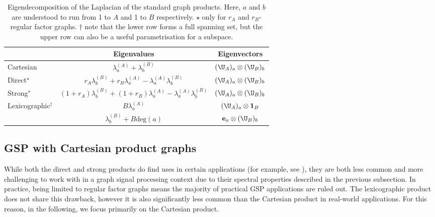 \begin{table}[h]
    \def\arraystretch{1.8}
    \centering
    \small
    \vspace{0.5cm}
    \begin{tabular}{|l|cc|}
        \hline 
    
        & Eigenvalues
        & Eigenvectors \\
    
        \hline
    
        Cartesian 
        & $\lambda_a^{(A)} + \lambda_b^{(B)}$ 
        & $(\U_A)_a \otimes (\U_B)_b$ \\
    
        Direct$^{\star}$
        & $r_A \lambda_b^{(B)} + r_B \lambda_a^{(A)} - \lambda_a^{(A)} \lambda_b^{(B)}$  
        & $(\U_A)_a \otimes (\U_B)_b$ \\
        
        Strong$^{\star}$
        & $(1+r_A) \lambda_b^{(B)} + (1+r_B) \lambda_a ^{(A)}- \lambda_a^{(A)} \lambda_b^{(B)}$
        & $(\U_A)_a \otimes (\U_B)_b$ \\
    
        \multirow{2}{7em}{Lexicographic$^\dagger$}
        & $B \lambda_a^{(A)}$ 
        & $(\U_A)_a \otimes \mathbf{1}_B$ \\

        & $\lambda_b^{(B)} + B \text{deg}(a)$ 
        & $\mathbf{e}_a \otimes (\U_B)_b$  \\
    
        \hline
    
    \end{tabular}
    \vspace{0.2cm}
    \caption[Spectral decomposition of product graphs]{Eigendecomposition of the Laplacian of the standard graph products. Here, $a$ and $b$ are understood to run from 1 to $A$ and 1 to $B$ respectively. $\star$ only for $r_A$ and $r_B$-regular factor graphs. $\dagger$ note that the lower row forms a full spanning set, but the upper row can also be a useful parametrisation for a subspace. } 
    \vspace{0.3cm}
    \label{tab:product_graph_spectra}
    \end{table}
    

\subsection{GSP with Cartesian product graphs} 

While both the direct and strong products do find uses in certain applications (for example, see \citep{Kaveh2011}), they are both less common and more challenging to work with in a graph signal processing context due to their spectral properties described in the previous subsection. In practice, being limited to regular factor graphs means the majority of practical GSP applications are ruled out. The lexicographic product does not share this drawback, however it is also significantly less common than the Cartesian product in real-world applications. For this reason, in the following, we focus primarily on the Cartesian product. 

